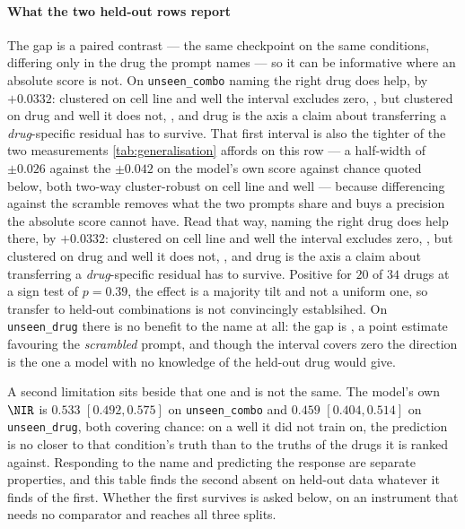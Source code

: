 \paragraph{What the two held-out rows report} The gap is a paired contrast --- the
same checkpoint on the same conditions, differing only in the drug the prompt
names --- so it can be informative where an absolute score is not. On
\texttt{unseen\_combo} naming the right drug does help, by $+0.0332$: clustered on
cell line and well the interval excludes zero, , but
clustered on drug and well it does not, , and drug
is the axis a claim about transferring a \emph{drug}-specific residual has to
survive. That first interval is also the tighter of the two measurements
\cref{tab:generalisation} affords on this row --- a half-width of $\pm 0.026$
against the $\pm 0.042$ on the model's own score against chance quoted below,
both two-way cluster-robust on cell line and well --- because differencing against
the scramble removes what the two prompts share and buys a precision the absolute
score cannot have. Read that way, naming the right drug does help there, by
$+0.0332$: clustered on cell line and well the interval excludes zero,
, but clustered on drug and well it does not,
, and drug is the axis a claim about transferring a
\emph{drug}-specific residual has to survive. Positive for $20$ of $34$ drugs at a
sign test of $p = 0.39$, the effect is a majority tilt and not a uniform one, so
transfer to held-out combinations is not convincingly establsihed. On \texttt{unseen\_drug}
there is no benefit to the name at all: the gap is
, a point estimate favouring the \emph{scrambled}
prompt, and though the interval covers zero the direction is the one a model with
no knowledge of the held-out drug would give.

A second limitation sits beside that one and is not the same. The model's own
$\NIR$ is $0.533$ $[0.492, 0.575]$ on \texttt{unseen\_combo} and $0.459$
$[0.404, 0.514]$ on \texttt{unseen\_drug}, both covering chance: on a well it did
not train on, the prediction is no closer to that condition's truth than to the
truths of the drugs it is ranked against. Responding to the name and predicting
the response are separate properties, and this table finds the second absent on
held-out data whatever it finds of the first. Whether the first survives is asked
below, on an instrument that needs no comparator and reaches all three splits.


